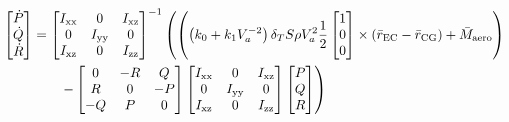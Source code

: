 \begin{align}
	\begin{split}
		\begin{bmatrix}
			\dot{P} \\
			\dot{Q} \\
			\dot{R}
		\end{bmatrix} &=
		\begin{bmatrix}
			I_{\textup{xx}} & 0 & I_{\textup{xz}} \\
			0 & I_{\textup{yy}} & 0 \\
			I_{\textup{xz}} & 0 & I_{\textup{zz}}
		\end{bmatrix}^{-1}
		\left(
		\left( \left( k_{0} + k_{1} V_{a}^{-2} \right) \delta_{T} S \rho V_{a}^{2} \frac{1}{2}
		\begin{bmatrix}
			1 \\ 0 \\ 0
		\end{bmatrix} \times \left( \bar{r}_{\text{EC}} - \bar{r}_{\text{CG}}\right) + \bar{M}_{\textup{aero}} \right) \right. \\
		& \qquad \left. -
		\begin{bmatrix}
			0 & -R & Q \\
			R & 0 & -P \\
			-Q & P & 0
		\end{bmatrix}
		\begin{bmatrix}
			I_{\textup{xx}} & 0 & I_{\textup{xz}} \\
			0 & I_{\textup{yy}} & 0 \\
			I_{\textup{xz}} & 0 & I_{\textup{zz}}
		\end{bmatrix}
		\begin{bmatrix}
			P \\
			Q \\
			R
		\end{bmatrix}
		\right)
	\end{split} \label{eqn:dotAngularRateStateExpandedComplete} 
\end{align}



